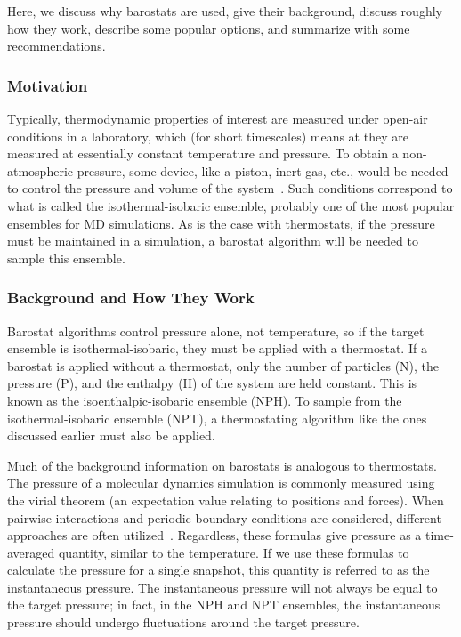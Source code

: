 \documentclass[9pt,bestpractices]{livecoms}
\begin{document}
Here, we discuss why barostats are used, give their background, discuss roughly how they work, describe some popular options, and summarize with some recommendations.

\subsubsection{Motivation}
Typically, thermodynamic properties of interest are measured under open-air conditions in a laboratory, which (for short timescales) means at they are measured at essentially constant temperature and pressure.
To obtain a non-atmospheric pressure, some device, like a piston, inert gas, etc\@., would be needed to control the pressure and volume of the system~\cite{tuckermanBook, ShellNotes}.
Such conditions correspond to what is called the isothermal-isobaric ensemble, probably one of the most popular ensembles for MD simulations.
As is the case with thermostats, if the pressure must be maintained in a simulation, a barostat algorithm will be needed to sample this ensemble.

\subsubsection{Background and How They Work}

Barostat algorithms control pressure alone, not temperature, so if the target ensemble is isothermal-isobaric, they must be applied with a thermostat.
If a barostat is applied without a thermostat, only the number of particles (N), the pressure (P), and the enthalpy (H) of the system are held constant.
This is known as the isoenthalpic-isobaric ensemble (NPH).
To sample from the isothermal-isobaric ensemble (NPT), a thermostating algorithm like the ones discussed earlier must also be applied.

Much of the background information on barostats is analogous to thermostats.
The pressure of a molecular dynamics simulation is commonly measured using the virial theorem (an expectation value relating to positions and forces)\cite{ShellNotes, LeachBook}.
When pairwise interactions and periodic boundary conditions are considered, different approaches are often utilized~\cite{allenTildesleyLiquids, tuckermanBook, ShellNotes}.
Regardless, these formulas give pressure as a time-averaged quantity, similar to the temperature.
If we use these formulas to calculate the pressure for a single snapshot, this quantity is referred to as the instantaneous pressure.
The instantaneous pressure will not always be equal to the target pressure; in fact, in the NPH and NPT ensembles, the instantaneous pressure should undergo fluctuations around the target pressure.
\end{document}
